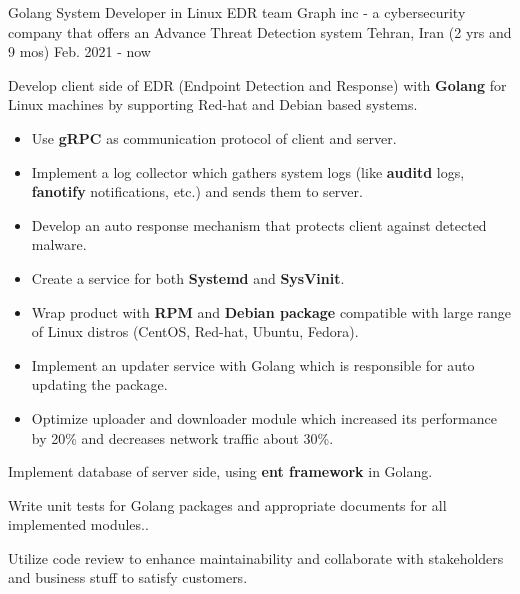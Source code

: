 

\begin{cventries}

  \cventry
    {Golang System Developer in Linux EDR team} %
    {Graph inc - \textnormal{a cybersecurity company that offers an Advance Threat Detection system}} %
    {Tehran, Iran} %
    {(2 yrs and 9 mos) Feb. 2021 - now} %
    {
      \begin{cvitems} %
        \item {Develop client side of EDR (Endpoint Detection and Response) with \textbf{Golang} for Linux machines by supporting Red-hat and Debian based systems.}
        \begin{itemize}
            \item Use \textbf{gRPC} as communication protocol of client and server.
            \item Implement a log collector which gathers system logs (like \textbf{auditd} logs, \textbf{fanotify} notifications, etc.) and sends them to server. 
            \item Develop an auto response mechanism that protects client against detected malware.
            \item Create a service for both \textbf{Systemd} and \textbf{SysVinit}.
            \item Wrap product with \textbf{RPM} and \textbf{Debian package} compatible with large range of Linux distros (CentOS, Red-hat, Ubuntu, Fedora).
            \item Implement an updater service with Golang which is responsible for auto updating the package.
            \item Optimize uploader and downloader module which increased its performance by 20\% and decreases network traffic about 30\%.
        \end{itemize}
        \item {Implement database of server side, using \textbf{ent framework} in Golang.}
        \item {Write unit tests for Golang packages and appropriate documents for all implemented modules..}
        \item Utilize code review to enhance maintainability and collaborate with stakeholders and business stuff to satisfy customers.
      \end{cvitems}
    }


\end{cventries}
